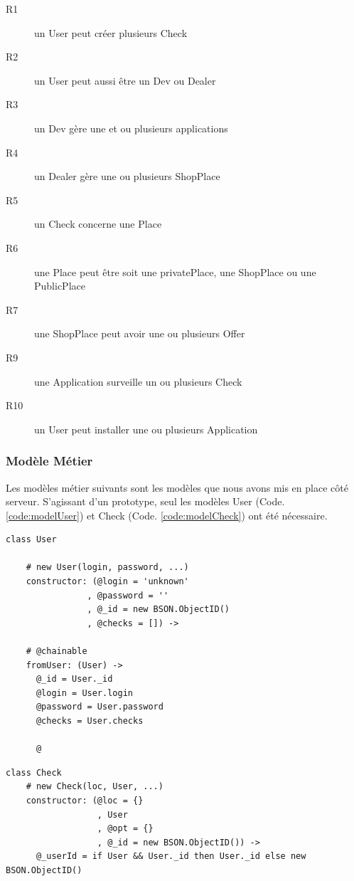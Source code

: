 \documentclass[a4paper,12pt]{report}
\begin{document}
\begin{onehalfspace}
\begin{description}
  \item[R1] un User peut créer plusieurs Check
  \item[R2] un User peut aussi être un Dev ou Dealer
  \item[R3] un Dev gère une et ou plusieurs applications
  \item[R4] un Dealer gère une ou plusieurs ShopPlace
  \item[R5] un Check concerne une Place
  \item[R6] une Place peut être soit une privatePlace, une ShopPlace ou une PublicPlace
  \item[R7] une ShopPlace peut avoir une ou plusieurs Offer
  \item[R9] une Application surveille un ou plusieurs Check
  \item[R10] un User peut installer une ou plusieurs Application
\end{description}

\subsubsection{Modèle Métier}
Les modèles métier suivants sont les modèles que nous avons mis en place côté serveur. S'agissant d'un prototype, seul les modèles User (Code. \ref{code:modelUser}) et Check (Code. \ref{code:modelCheck}) ont été nécessaire.

\begin{lstlisting}[float=htb, frame=lines, caption={Model User}, label={code:modelUser}]
class User

    # new User(login, password, ...)
    constructor: (@login = 'unknown'
                , @password = ''
                , @_id = new BSON.ObjectID()
                , @checks = []) ->

    # @chainable
    fromUser: (User) ->
      @_id = User._id
      @login = User.login
      @password = User.password
      @checks = User.checks

      @
\end{lstlisting}

\begin{lstlisting}[float=htb, frame=lines, caption={Model Check}, label={code:modelCheck}]
class Check
    # new Check(loc, User, ...)
    constructor: (@loc = {}
                  , User
                  , @opt = {}
                  , @_id = new BSON.ObjectID()) ->
      @_userId = if User && User._id then User._id else new BSON.ObjectID()


\end{lstlisting}
\end{onehalfspace}
\end{document}
